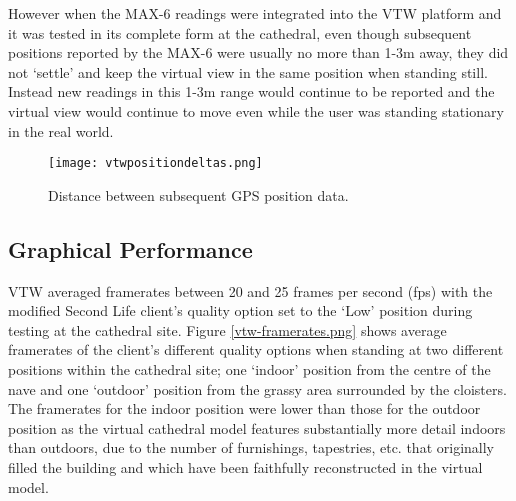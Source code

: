 However when the MAX-6 readings were integrated into the VTW platform and it was tested in its complete form at the cathedral, even though subsequent positions reported by the MAX-6 were usually no more than 1-3m away, they did not `settle' and keep the virtual view in the same position when standing still. Instead new readings in this 1-3m range would continue to be reported and the virtual view would continue to move even while the user was standing stationary in the real world.

\begin{figure}[h]
\centering
\texttt{[image: vtwpositiondeltas.png]}
\caption{Distance between subsequent GPS position data.}
\label{vtwpositiondeltas.png}
\end{figure}




\subsection{Graphical Performance}

VTW averaged framerates between 20 and 25 frames per second (fps) with the modified Second Life client's quality option set to the `Low' position during testing at the cathedral site. Figure \ref{vtw-framerates.png} shows average framerates of the client's different quality options when standing at two different positions within the cathedral site; one `indoor' position from the centre of the nave and one `outdoor' position from the grassy area surrounded by the cloisters. The framerates for the indoor position were lower than those for the outdoor position as the virtual cathedral model features substantially more detail indoors than outdoors, due to the number of furnishings, tapestries, etc. that originally filled the building and which have been faithfully reconstructed in the virtual model.

